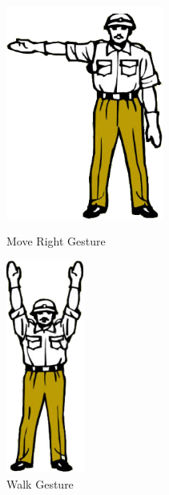 \begin{figure}
\begin{minipage}
	\end{minipage}
	\begin{minipage}
		{.45 
		\textwidth} \centering 
		\includegraphics[height=7cm]{figures/content/ges-move-right.png} \caption{Move Right Gesture} \label{fg:ges:5} 
	\end{minipage}
	\begin{minipage}
		{.45 
		\textwidth} \centering 
		\includegraphics[height=7cm]{figures/content/ges-walk.png} \caption{Walk Gesture} \label{fg:ges:1} 
	\end{minipage}	
\end{figure}
\label{fg:ges:hands} 
